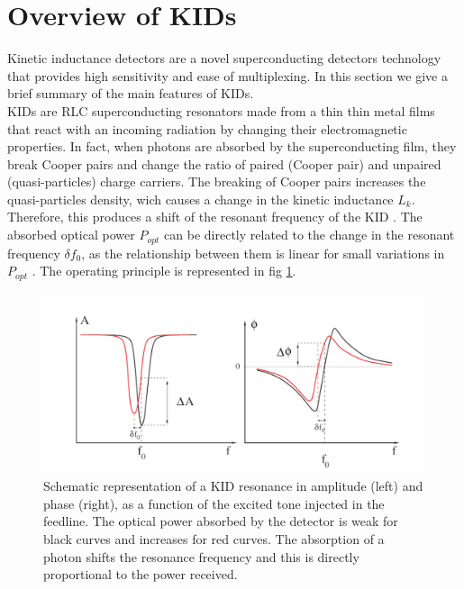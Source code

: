 \section{Overview of KIDs}
\label{sec2}

Kinetic inductance detectors are a novel superconducting detectors technology that provides high sensitivity and ease of multiplexing. In this section we give a brief summary of the main features of KIDs.\\
KIDs are RLC superconducting resonators made from a thin thin metal films that react with an incoming radiation by changing their electromagnetic properties. In fact, when photons are absorbed by the superconducting film, they break Cooper pairs and change the ratio of paired (Cooper pair) and unpaired (quasi-particles) charge carriers. The breaking of Cooper pairs increases the quasi-particles density, wich causes a change in the kinetic inductance $L_{k}$. Therefore, this produces a shift of the resonant frequency of the KID \citep{2013A&A...551L..12C}. The absorbed optical power $P_{opt}$ can be directly related to the change in the resonant frequency $\delta f_{0}$, as the relationship between them is linear for small variations in $P_{opt}$ \citep{2010ApPhL..96z3511S}. The operating principle is represented in fig \ref{resonance}.\\

\begin{figure}[h]
\center
	\includegraphics[scale=0.35]{resonance.png}
	\caption{Schematic representation of a KID resonance in amplitude (left) and phase (right), as a function of the excited tone injected in the feedline. The optical power absorbed by the detector is weak for black curves and increases for red curves. The absorption of a photon shifts the resonance frequency and this is directly proportional to the power received.}
	\label{resonance}
\end{figure}

